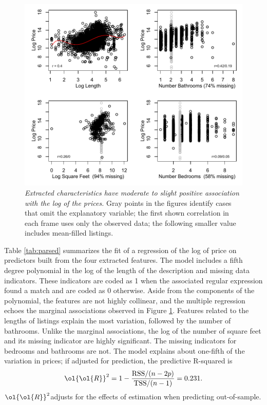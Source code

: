 \documentclass[12pt]{article}
\newcommand{\prs}{\mbox{$\ol{\ol{R}}^2$}}
\begin{document}
 \begin{figure}
  \caption{ \label{fig:parsed} { \sl Extracted characteristics have moderate to
 slight positive association with the log of the prices. } Gray points in the
 figures identify cases that omit the explanatory variable; the first shown
 correlation in each frame uses only the observed data; the following smaller 
 value includes mean-filled listings. }
 
\centerline{
 \vspace{0.1in}
 \includegraphics[width=5in]{figures/parsed} }
 \vspace{0.2in}
 \end{figure}


 Table \ref{tab:parsed} summarizes the fit of a regression of the log of price
 on predictors built from the four extracted features. The model includes a
 fifth degree polynomial in the log of the length of the description and missing
 data indicators.  These indicators are coded as 1 when the associated regular
 expression found a match and are coded as 0 otherwise.  Aside from the
 components of the polynomial, the features are not highly collinear, and the
 multiple regression echoes the marginal associations observed in Figure
 \ref{fig:parsed}.  Features related to the lengths of listings explain the most
 variation, followed by the number of bathrooms.  Unlike the marginal
 associations, the log of the number of square feet and its missing indicator
 are highly significant.  The missing indicators for bedrooms and bathrooms are
 not.  The model explains about one-fifth of the variation in prices;  
 if adjusted for prediction, the predictive R-squared \citep{fosterstine14b} is
 \begin{equation}
   \prs = 1 - \frac{\mbox{RSS}/(n-2p)}{\mbox{TSS}/(n-1)} = 0.231.
 \end{equation}
 \prs adjusts for the effects of estimation when predicting out-of-sample.
\end{document}
